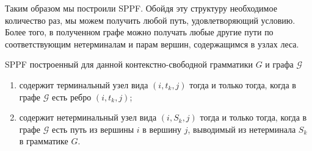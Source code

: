 \begin{example}
\begin{center}
{
    }
    \end{center}

    Таким образом мы построили SPPF. Обойдя эту структуру необходимое количество раз, мы можем получить любой путь, удовлетворяющий условию. Более того, в полученном графе можно получать любые другие пути по соответствующим нетерминалам и парам вершин, содержащимся в узлах леса.
    \end{example}

    \begin{note}
    SPPF построенный для данной контекстно-свободной грамматики $G$ и графа $\mathcal{G}$
    \begin{enumerate}
      \item содержит терминальный узел вида $(i,t_k,j)$ тогда и только тогда, когда в графе $\mathcal{G}$ есть ребро $(i,t_k,j)$;
      \item содержит нетерминальный узел вида $(i,S_k,j)$ тогда и только тогда, когда в графе $\mathcal{G}$ есть путь из вершины $i$ в вершину $j$, выводимый из нетерминала $S_k$ в грамматике $G$.
    \end{enumerate}
    \end{note}

